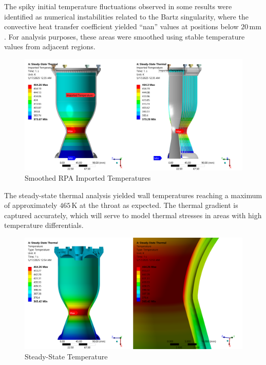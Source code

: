 The spiky initial temperature fluctuations observed in some results were identified as numerical instabilities related to the Bartz singularity, where the convective heat transfer coefficient yielded ``nan'' values at positions below $20\,\text{mm}$. For analysis purposes, these areas were smoothed using stable temperature values from adjacent regions.
\begin{figure}
    \centering
    \includegraphics[width=1\linewidth]{Images/Imported Temperatures.png}
    \caption{Smoothed RPA Imported Temperatures}
    \label{fig:Smoothed RPA Imported Temperatures}
\end{figure}

The steady-state thermal analysis yielded wall temperatures reaching a maximum of approximately $465\,\text{K}$ at the throat as expected. The thermal gradient is captured accurately, which will serve to model thermal stresses in areas with high temperature differentials.  
\begin{figure}
    \centering
    \includegraphics[width=1\linewidth]{Images/Steady-State Temperature.png}
    \caption{Steady-State Temperature}
    \label{fig:Steady-State Temperature}
\end{figure}

